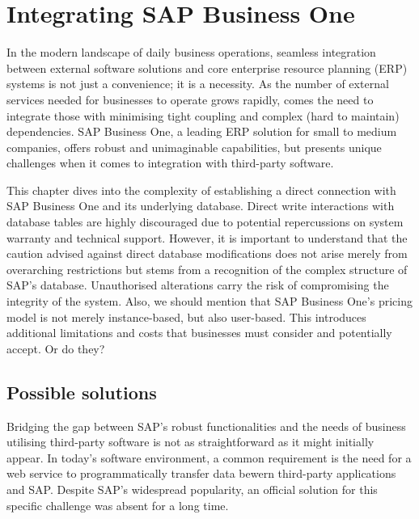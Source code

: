 \chapter{Integrating SAP Business One}
\label{chap:integrating-sap-b1}

In the modern landscape of daily business operations, seamless integration between external software solutions and core enterprise resource planning (ERP) systems is not just a convenience; it is a necessity.
As the number of external services needed for businesses to operate grows rapidly, comes the need to integrate those with minimising tight coupling and complex (hard to maintain) dependencies.
SAP Business One, a leading ERP solution for small to medium companies, offers robust and unimaginable capabilities, but presents unique challenges when it comes to integration with third-party software. 

This chapter dives into the complexity of establishing a direct connection with SAP Business One and its underlying database. 
Direct write interactions with database tables are highly discouraged due to potential repercussions on system warranty and technical support.
However, it is important to understand that the caution advised against direct database modifications does not arise merely from overarching restrictions but stems from a recognition of the complex structure of SAP's database. Unauthorised alterations carry the risk of compromising the integrity of the system.
Also, we should mention that SAP Business One's pricing model is not merely instance-based, but also user-based.
This introduces additional limitations and costs that businesses must consider and potentially accept. 
Or do they?

\section{Possible solutions}
\label{sec:possible-solutions}

Bridging the gap between SAP's robust functionalities and the needs of business utilising third-party software is not as straightforward as it might initially appear. 
In today's software environment, a common requirement is the need for a web service to programmatically transfer data bewern third-party applications and SAP.
Despite SAP's widespread popularity, an official solution for this specific challenge was absent for a long time.

